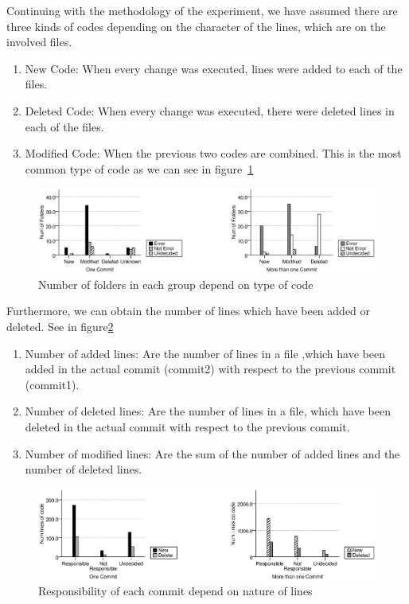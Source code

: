 \documentclass[a4paper]{article}
\begin{document}
Continuing with the methodology of the experiment, we have assumed there are three kinds of codes depending on the character of the lines, which are on the involved files. 

\begin{enumerate}
    \item New Code: When every change was executed, lines were added to each of the files.
    \item Deleted Code: When every change was  executed, there were deleted lines in each of the files.
    \item Modified Code: When the previous two codes are combined. This is the most common type of code as we can see in figure~\ref{fig:kindOfcode}
\end{enumerate}

\begin{figure}[htb]
\centering
\includegraphics[width=1\textwidth]{kindOfcode}
\caption{Number of folders in each group depend on type of code} \label{fig:kindOfcode}
\end{figure}

Furthermore, we can obtain the number of lines which have been added or deleted. See in figure\ref{fig:linesOfcode}

\begin{enumerate}
    \item Number of added lines: Are the number of lines in a file ,which have been added in the actual commit (commit2) with respect to the previous commit (commit1).   
     \item Number of deleted lines: Are the number of lines in a file, which have been deleted in the actual commit with respect to the previous commit.
     \item Number of modified lines: Are the sum of the number of added lines and the number of deleted lines.
\end{enumerate}

\begin{figure}[htb]
\centering
\includegraphics[width=1\textwidth]{linesOfcode}
\caption{Responsibility of each commit depend on nature of lines} \label{fig:linesOfcode}
\end{figure}
\end{document}
